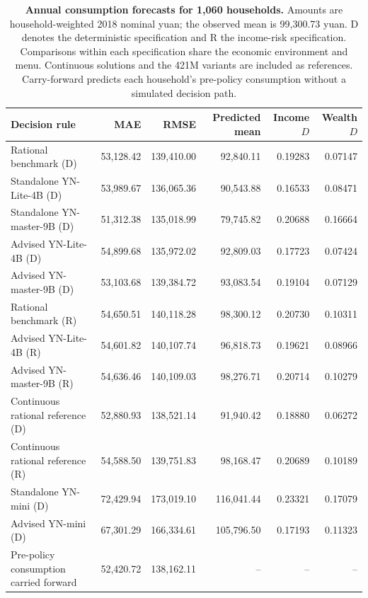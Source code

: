 \begin{table}[H]
\centering\footnotesize
\setlength{\tabcolsep}{3.5pt}
\begin{tabularx}{\textwidth}{@{}Xrrrrr@{}}
\toprule
Decision rule & MAE & RMSE & Predicted mean & Income $D$ & Wealth $D$\\
\midrule
Rational benchmark (D) & 53,128.42 & 139,410.00 & 92,840.11 & 0.19283 & 0.07147\\
Standalone YN-Lite-4B (D) & 53,989.67 & 136,065.36 & 90,543.88 & 0.16533 & 0.08471\\
Standalone YN-master-9B (D) & 51,312.38 & 135,018.99 & 79,745.82 & 0.20688 & 0.16664\\
Advised YN-Lite-4B (D) & 54,899.68 & 135,972.02 & 92,809.03 & 0.17723 & 0.07424\\
Advised YN-master-9B (D) & 53,103.68 & 139,384.72 & 93,083.54 & 0.19104 & 0.07129\\
\midrule
Rational benchmark (R) & 54,650.51 & 140,118.28 & 98,300.12 & 0.20730 & 0.10311\\
Advised YN-Lite-4B (R) & 54,601.82 & 140,107.74 & 96,818.73 & 0.19621 & 0.08966\\
Advised YN-master-9B (R) & 54,636.46 & 140,109.03 & 98,276.71 & 0.20714 & 0.10279\\
\midrule
Continuous rational reference (D) & 52,880.93 & 138,521.14 & 91,940.42 & 0.18880 & 0.06272\\
Continuous rational reference (R) & 54,588.50 & 139,751.83 & 98,168.47 & 0.20689 & 0.10189\\
\midrule
Standalone YN-mini (D) & 72,429.94 & 173,019.10 & 116,041.44 & 0.23321 & 0.17079\\
Advised YN-mini (D) & 67,301.29 & 166,334.61 & 105,796.50 & 0.17193 & 0.11323\\
\midrule Pre-policy consumption carried forward & 52,420.72 & 138,162.11 & -- & -- & --\\
\bottomrule
\end{tabularx}
\caption{\textbf{Annual consumption forecasts for 1,060 households.} Amounts are household-weighted 2018 nominal yuan; the observed mean is 99,300.73 yuan. D denotes the deterministic specification and R the income-risk specification. Comparisons within each specification share the economic environment and menu. Continuous solutions and the 421M variants are included as references. Carry-forward predicts each household's pre-policy consumption without a simulated decision path.}
\label{hh:tab:complete}
\end{table}

